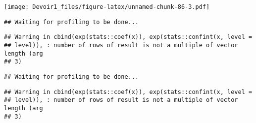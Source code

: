 \documentclass[]{article}
\newenvironment{Shaded}{\begin{snugshade}}{\end{snugshade}}
\newcommand{\KeywordTok}[1]{\textcolor[rgb]{0.13,0.29,0.53}{\textbf{#1}}}
\newcommand{\DataTypeTok}[1]{\textcolor[rgb]{0.13,0.29,0.53}{#1}}
\newcommand{\DecValTok}[1]{\textcolor[rgb]{0.00,0.00,0.81}{#1}}
\newcommand{\StringTok}[1]{\textcolor[rgb]{0.31,0.60,0.02}{#1}}
\newcommand{\OperatorTok}[1]{\textcolor[rgb]{0.81,0.36,0.00}{\textbf{#1}}}
\newcommand{\NormalTok}[1]{#1}
\begin{document}
\texttt{[image: Devoir1\_files/figure-latex/unnamed-chunk-86-3.pdf]}

\begin{Shaded}
\end{Shaded}

\begin{verbatim}
## Waiting for profiling to be done...
\end{verbatim}

\begin{verbatim}
## Warning in cbind(exp(stats::coef(x)), exp(stats::confint(x, level =
## level)), : number of rows of result is not a multiple of vector length (arg
## 3)
\end{verbatim}

\begin{verbatim}
## Waiting for profiling to be done...
\end{verbatim}

\begin{verbatim}
## Warning in cbind(exp(stats::coef(x)), exp(stats::confint(x, level =
## level)), : number of rows of result is not a multiple of vector length (arg
## 3)
\end{verbatim}
\end{document}
